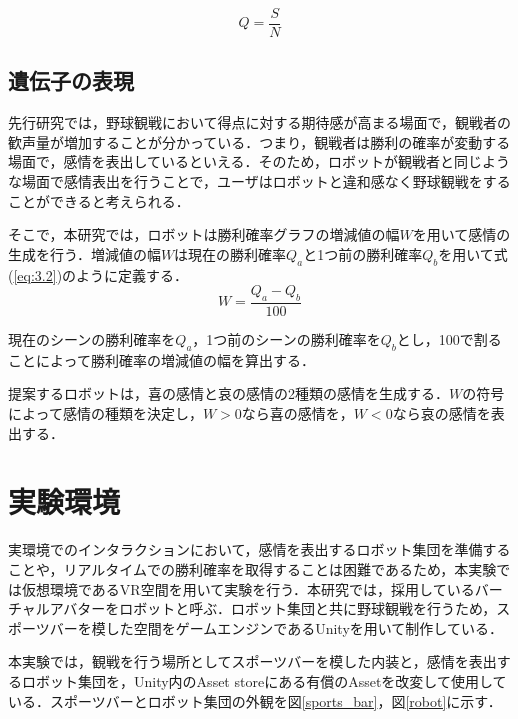 \begin{equation}
\label{eq:3.1}
　Q = \frac{S}{N}
\end{equation}





\subsection{遺伝子の表現}
\label{sec3.1.2}

先行研究では，野球観戦において得点に対する期待感が高まる場面で，観戦者の歓声量が増加することが分かっている\cite{rinjyo3}．つまり，観戦者は勝利の確率が変動する場面で，感情を表出しているといえる．そのため，ロボットが観戦者と同じような場面で感情表出を行うことで，ユーザはロボットと違和感なく野球観戦をすることができると考えられる．

そこで，本研究では，ロボットは勝利確率グラフの増減値の幅$W$を用いて感情の生成を行う．増減値の幅$W$は現在の勝利確率$Q_{a}$と1つ前の勝利確率$Q_{b}$を用いて式(\ref{eq:3.2})のように定義する．
\begin{equation}
\label{eq:3.2}
　W = \frac{Q_{a}-Q_{b}}{100}
\end{equation}

現在のシーンの勝利確率を$Q_{a}$，1つ前のシーンの勝利確率を$Q_{b}$とし，100で割ることによって勝利確率の増減値の幅を算出する．

提案するロボットは，喜の感情と哀の感情の2種類の感情を生成する．$W$の符号によって感情の種類を決定し，$W > 0$なら喜の感情を，$W < 0$なら哀の感情を表出する．


\newpage

\section{実験環境}
\label{sec3.2}

実環境でのインタラクションにおいて，感情を表出するロボット集団を準備することや，リアルタイムでの勝利確率を取得することは困難であるため，本実験では仮想環境であるVR空間を用いて実験を行う．本研究では，採用しているバーチャルアバターをロボットと呼ぶ．ロボット集団と共に野球観戦を行うため，スポーツバーを模した空間をゲームエンジンであるUnityを用いて制作している\cite{unity}．

本実験では，観戦を行う場所としてスポーツバーを模した内装と，感情を表出するロボット集団を，Unity内のAsset storeにある有償のAssetを改変して使用している\cite{bar}\cite{lilrobot}．スポーツバーとロボット集団の外観を図\ref{sports_bar}，図\ref{robot}に示す．

